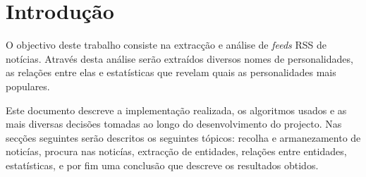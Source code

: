 \section{Introdução}
O objectivo deste trabalho consiste na extracção e análise de \textit{feeds} RSS de notícias. Através desta análise serão extraídos diversos nomes de personalidades, as relações entre elas e estatísticas que revelam quais as personalidades mais populares.

Este documento descreve a implementação realizada, os algoritmos usados e as mais diversas decisões tomadas ao longo do desenvolvimento do projecto. Nas secções seguintes serão descritos os seguintes tópicos: recolha e armanezamento de noticías, procura nas noticías, extracção de entidades, relações entre entidades, estatísticas, e por fim uma conclusão que descreve os resultados obtidos.